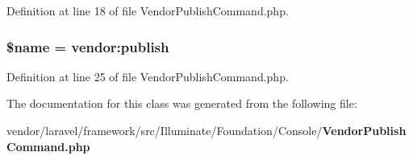 Definition at line 18 of file Vendor\+Publish\+Command.\+php.

\subsubsection[{\$name}]{\setlength{\rightskip}{0pt plus 5cm}\${\bf name} = \textquotesingle{}vendor\+:publish\textquotesingle{}\hspace{0.3cm}{\ttfamily [protected]}}\label{class_illuminate_1_1_foundation_1_1_console_1_1_vendor_publish_command_ab2fc40d43824ea3e1ce5d86dee0d763b}


Definition at line 25 of file Vendor\+Publish\+Command.\+php.



The documentation for this class was generated from the following file\+:\begin{DoxyCompactItemize}
\item 
vendor/laravel/framework/src/\+Illuminate/\+Foundation/\+Console/{\bf Vendor\+Publish\+Command.\+php}\end{DoxyCompactItemize}
